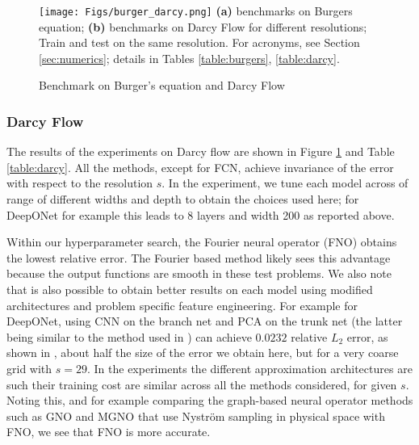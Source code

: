 \begin{figure}
    \centering
    \texttt{[image: Figs/burger\_darcy.png]}
    \small{ \textbf{(a)} benchmarks on Burgers equation;  \textbf{(b)} benchmarks on Darcy Flow for different resolutions; Train and test on the same resolution.
    For acronyms, see Section \ref{sec:numerics}; details in Tables \ref{table:burgers}, \ref{table:darcy}.} 
    \caption{Benchmark on Burger's equation and Darcy Flow }
    \label{fig:error}
\end{figure}
\subsubsection{Darcy Flow}
\label{ssec:DF}

The results of the experiments on Darcy flow are shown in Figure \ref{fig:error} and Table \ref{table:darcy}. All the methods, except for FCN, achieve invariance of
the error with respect to the resolution $s$. In the experiment, we tune each model across of range of different widths and depth to obtain
the choices used here; for DeepONet for example this leads to
8 layers and width 200 as reported above.

Within our hyperparameter search, the Fourier neural operator (FNO) obtains the lowest relative error. 
The Fourier based method likely sees this advantage because the output functions are smooth in these test problems.
We also note that is also possible to obtain better results on each model using modified architectures and problem specific feature engineering.
For example for DeepONet, using CNN on the branch net and PCA on the trunk net (the latter being similar to the method used in
\cite{Kovachki}) can achieve $0.0232$ relative $L_2$ error, as shown in \cite{lu2021comprehensive}, about half the size of the error we obtain here, but for a very coarse grid with $s=29.$
In the experiments the different approximation architectures are
such their training cost are similar across all the methods considered, for given $s.$ Noting this, and for example
comparing the graph-based neural operator methods such as GNO and MGNO that use Nystr\"om sampling in physical space with FNO, we
see that FNO is more accurate.
 
